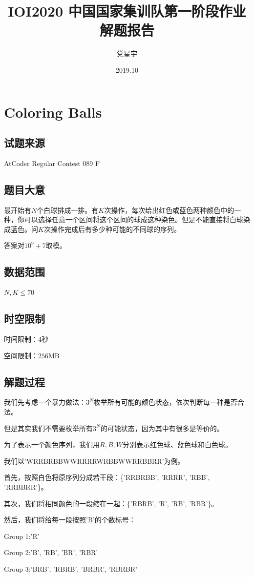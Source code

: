 \documentclass[12pt]{article}
\title{IOI2020 中国国家集训队第一阶段作业\\解题报告}
\author{党星宇}
\date{2019.10}
\begin{document}
\maketitle

\newpage

\section{Coloring Balls}
\subsection{试题来源}
AtCoder Regular Contest 089 F
\subsection{题目大意}
最开始有$N$个白球排成一排。有$K$次操作，每次给出红色或蓝色两种颜色中的一种，你可以选择任意一个区间将这个区间的球成这种染色。但是不能直接将白球染成蓝色。问$K$次操作完成后有多少种可能的不同球的序列。

答案对$10^9+7$取模。
\subsection{数据范围}
$N,K\le 70$
\subsection{时空限制}
时间限制：$4$秒

空间限制：$256$MB
\subsection{解题过程}
我们先考虑一个暴力做法：$3^N$枚举所有可能的颜色状态，依次判断每一种是否合法。

但是其实我们不需要枚举所有$3^N$的可能状态，因为其中有很多是等价的。

为了表示一个颜色序列，我们用$R,B,W$分别表示红色球、蓝色球和白色球。

我们以'WRRBRBBWWRRRRWRBBWWRRBBRR'为例。

首先，按照白色将原序列分成若干段：\{'RRBRBB', 'RRRR', 'RBB', 'RRBBRR'\}。

其次，我们将相同颜色的一段缩在一起：\{'RBRB', 'R', 'RB', 'RBR'\}。

然后，我们将给每一段按照'B'的个数标号：

Group 1:'R'

Group 2:'B', 'RB', 'BR', 'RBR'

Group 3:'BRB', 'RBRB', 'BRBR', 'RBRBR'
\end{document}
